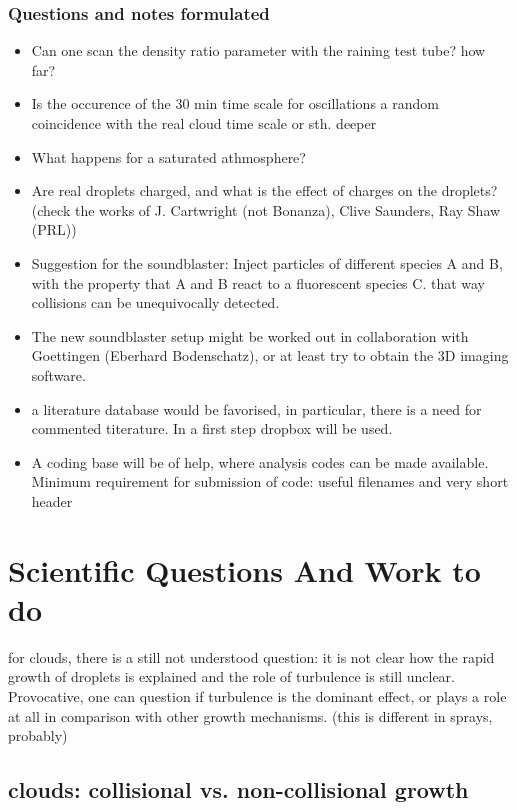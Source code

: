 \documentclass{report}
\begin{document}
\subsection{Questions and notes formulated}

\begin{itemize}
 \item Can one scan the density ratio parameter with the raining test tube? how far?
 \item Is the occurence of the 30 min time scale for oscillations a random coincidence 
       with the real cloud time scale or sth. deeper
 \item What happens for a saturated athmosphere?
 \item Are real droplets charged, and what is the effect of charges on the droplets?
   (check the works of J. Cartwright (not Bonanza), Clive Saunders, Ray Shaw (PRL))
 \item Suggestion for the soundblaster: Inject particles of different species A and B, 
 with the property that A and B react to a fluorescent species C. that way collisions
 can be unequivocally detected.
 \item The new soundblaster setup might be worked out in collaboration with Goettingen
 (Eberhard Bodenschatz), or at least try to obtain the 3D imaging software.
 \item a literature database would be favorised, in particular, there is a need for
 commented titerature. In a first step dropbox will be used.
 \item A coding base will be of help, where analysis codes can be made available.
 Minimum requirement for submission of code: useful filenames and very short header
\end{itemize}

\chapter{Scientific Questions And Work to do}

for clouds, there is a still not understood question:
it is not clear how the rapid growth of droplets is explained and
the role of turbulence is still unclear. 
Provocative, one can question if turbulence is the dominant effect,
or plays a role at all in comparison with other growth mechanisms.
(this is different in sprays, probably)
\section{clouds: collisional vs. non-collisional growth}
\end{document}

